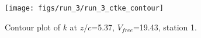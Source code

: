 \begin{figure}[H]
\centering
\texttt{[image: figs/run\_3/run\_3\_ctke\_contour]}
\caption{Contour plot of $k$ at $z/c$=5.37, $V_{free}$=19.43, station 1.}
\label{fig:run_3_ctke_contour}
\end{figure}


